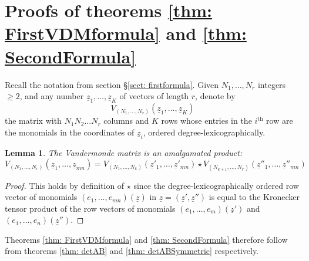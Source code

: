 \documentclass[10pt]{amsart}
\newtheorem{lem}[thm]{Lemma}
\theoremstyle{definition}
\theoremstyle{remark}
\numberwithin{equation}{section}
\newcommand{\z}{\underline{z}}
\newcommand{\0}{\color{blue}{\mathsf{0}}}
\begin{document}
  \section{Proofs of theorems \ref{thm: FirstVDMformula} and  \ref{thm: SecondFormula}}
Recall the notation from section \S\ref{sect: firstformula}. Given $N_1,\ldots, N_r$ integers $\geq 2$, and any number $\z_1,\ldots, \z_K$ of vectors of length $r$, denote by 
\[ V_{(N_1,\ldots, N_r)} (\z_1,\ldots, \z_K)\]
the matrix with $N_1N_2\ldots N_r$ columns and $K$ rows whose entries in the $i^{\mathrm{th}}$ row are the monomials in the coordinates of $\z_i$, ordered degree-lexicographically. 


\begin{lem} The Vandermonde matrix is an amalgamated  product:
\[V_{(N_1,\ldots, N_r)} (\z_1,\ldots, \z_{mn}) = V_{(N_1,\ldots, N_k)}(\z'_1,\ldots, \z'_{mn}) \star V_{(N_{k+1},\ldots, N_r)}(\z''_1,\ldots, \z''_{mn}) \]
\end{lem} 

\begin{proof} This holds by definition of $\star$ since 
the degree-lexicographically ordered row vector of monomials $(e_{1},\ldots, e_{mn})(\z)$ in $\z=(\z',\z'')$ is equal to the Kronecker tensor product of the row vectors of monomials
$(e_1,\ldots, e_m)(\z')$ and $(e_1,\ldots, e_n)(\z'')$.  
\end{proof} 
 
Theorems 
 \ref{thm: FirstVDMformula} and  \ref{thm: SecondFormula} therefore follow  from theorems \ref{thm: detAB} and \ref{thm: detABSymmetric} respectively. 
 
\end{document}
